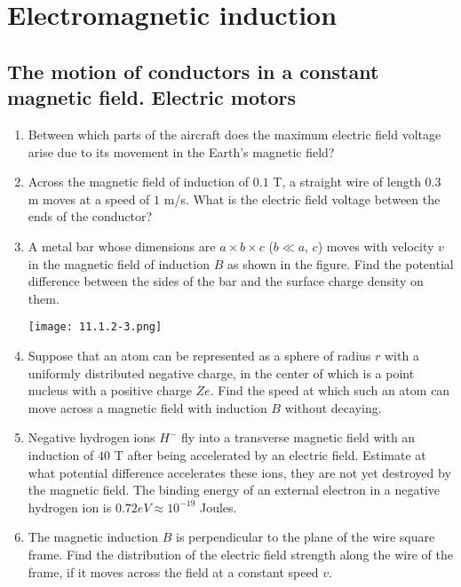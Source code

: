 \documentclass{article}
\begin{document}
\section{Electromagnetic induction}
\subsection{The motion of conductors in a constant magnetic field. Electric motors}

\begin{enumerate}[label=11.1.\arabic*]

\item Between which parts of the aircraft does the maximum electric field voltage arise due to its movement in the Earth's magnetic field?

\item Across the magnetic field of induction of $0.1$ T, a straight wire of length $0.3$ m moves at a speed of $1$ m/s. What is the electric field voltage between the ends of the conductor?

\item A metal bar whose dimensions are $a \times b \times c$ ($b \ll a$, $c$) moves with velocity $v$ in the magnetic field of induction $B$ as shown in the figure. Find the potential difference between the sides of the bar and the surface charge density on them.

\begin{center}
    \texttt{[image: 11.1.2-3.png]}
\end{center}


\item Suppose that an atom can be represented as a sphere of radius $r$ with a uniformly distributed negative charge, in the center of which is a point nucleus with a positive charge $Ze$. Find the speed at which such an atom can move across a magnetic field with induction $B$ without decaying.

\item Negative hydrogen ions $H^-$ fly into a transverse magnetic field with an induction of $40$ T after being accelerated by an electric field. Estimate at what potential difference accelerates these ions, they are not yet destroyed by the magnetic field. The binding energy of an external electron in a negative hydrogen ion is $0.72 eV \approx 10^{-19}$ Joules.

\item The magnetic induction $B$ is perpendicular to the plane of the wire square frame. Find the distribution of the electric field strength along the wire of the frame, if it moves across the field at a constant speed $v$.


\end{enumerate}
\end{document}
